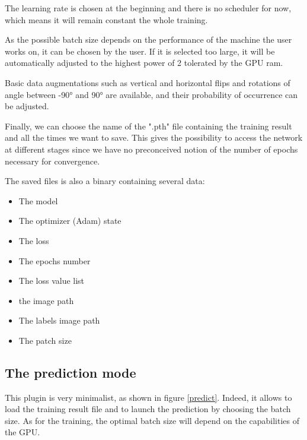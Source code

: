 \documentclass{article}
\begin{document}
The learning rate is chosen at the beginning and there is no scheduler for now, which means it will remain constant the whole training. 

As the possible batch size depends on the performance of the machine the user works on, it can be chosen by the user. If it is selected too large, it will be automatically adjusted to the highest power of 2 tolerated by the GPU ram.

Basic data augmentations such as vertical and horizontal flips and rotations of angle between -90° and 90° are available, and their probability of occurrence can be adjusted. 

Finally, we can choose the name of the ".pth" file containing the training result and all the times we want to save. This gives the possibility to access the network at different stages since we have no preconceived notion of the number of epochs necessary for convergence.

The saved files is also a binary containing several data:
\begin{itemize}
  \item The model
  \item The optimizer (Adam) state
  \item The loss
  \item The epochs number
  \item The loss value list
  \item the image path
  \item The labels image path
  \item The patch size
\end{itemize}



\subsection{The prediction mode}

This plugin is very minimalist, as shown in figure \ref{predict}. Indeed, it allows to load the training result file and to launch the prediction by choosing the batch size. As for the training, the optimal batch size will depend on the capabilities of the GPU.
\end{document}
